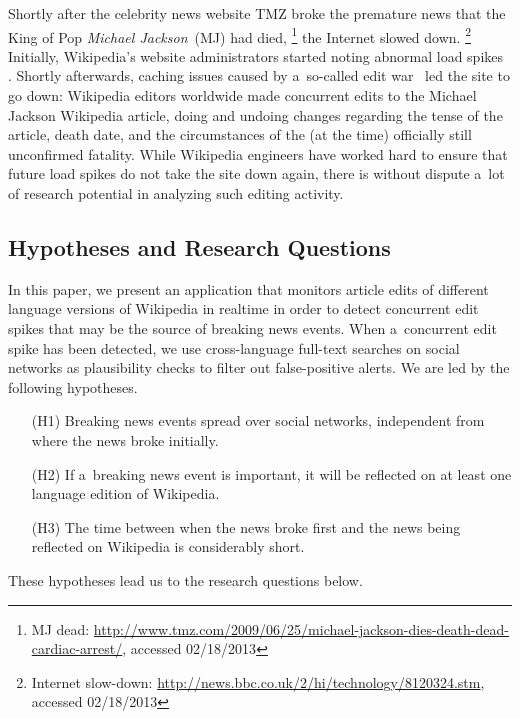 \documentclass{www13-companion-accepted}
\newcommand{\inlinelistingsize}{\fontsize{8pt}{11pt}}
\let\oldurl\url
\renewcommand{\url}[1]{\inlinelistingsize\oldurl{#1}}
\begin{document}
Shortly after the celebrity news website TMZ
broke the premature news that the King of Pop \emph{Michael Jackson}~(MJ) had died,%
\footnote{MJ dead: \url{http://www.tmz.com/2009/06/25/michael-jackson-dies-death-dead-cardiac-arrest/},
accessed 02/18/2013}
the Internet slowed down.%
\footnote{Internet slow-down: \url{http://news.bbc.co.uk/2/hi/technology/8120324.stm},
accessed 02/18/2013}
Initially, Wikipedia's website administrators started noting abnormal load spikes~%
\cite{vibber2009currentevents}. Shortly afterwards, caching issues
caused by a~so-called edit war~\cite{beaumont2009editwar} led the site to go down:
Wikipedia editors worldwide made concurrent edits
to the Michael Jackson Wikipedia article, doing and undoing changes
regarding the tense of the article, death date,
and the circumstances of the (at the time) officially still unconfirmed fatality.
While Wikipedia engineers have worked hard
to ensure that future load spikes
do not take the site down again, there is without dispute a~lot of research potential
in analyzing such editing activity.

\subsection{Hypotheses and Research Questions}
\label{sec:hypotheses-and-research-questions}

In this paper, we present an application that monitors article edits
of different language versions of Wikipedia in realtime
in order to detect concurrent edit spikes that may be the source of
breaking news events.
When a~concurrent edit spike has been detected,
we use cross-language full-text searches on social networks
as plausibility checks to filter out false-positive alerts.
We are led by the following hypotheses.

\begin{itemize}
  \itemsep0em
  \item[(H1)] Breaking news events spread over social networks,
    independent from where the news broke initially.
  \item[(H2)] If a~breaking news event is important, it will be reflected on
    at least one language edition of Wikipedia.
  \item[(H3)] The time between when the news broke first and the news
    being reflected on Wikipedia is considerably short.
\end{itemize}

\noindent These hypotheses lead us to the research questions below.
\end{document}
